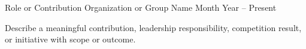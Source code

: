 

\begin{cventries}

  \cventry
    {Role or Contribution} %
    {Organization or Group Name} %
    {} %
    {Month Year -- Present} %
    {
      \begin{cvitems}
        \item {Describe a meaningful contribution, leadership responsibility, competition result, or initiative with scope or outcome.}
      \end{cvitems}
    }

\end{cventries}
